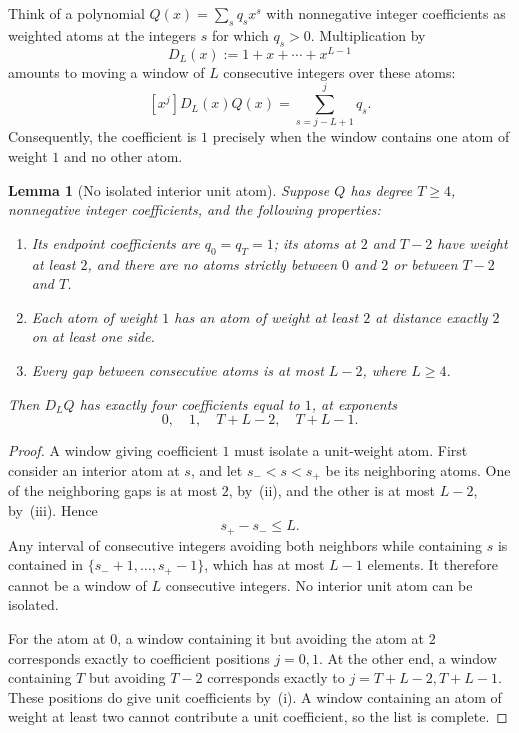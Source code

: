 \documentclass[11pt]{article}
\newtheorem{lemma}[theorem]{Lemma}
\theoremstyle{definition}\newtheorem{definition}[theorem]{Definition}
\theoremstyle{remark}\newtheorem{remark}[theorem]{Remark}
\begin{document}
Think of a polynomial $Q(x)=\sum_s q_sx^s$ with nonnegative integer coefficients as weighted atoms at the integers $s$ for which $q_s>0$. Multiplication by
\[
 D_L(x):=1+x+\cdots+x^{L-1}
\]
amounts to moving a window of $L$ consecutive integers over these atoms:
\begin{equation}\label{eq:window}
 [x^j]D_L(x)Q(x)=\sum_{s=j-L+1}^j q_s.
\end{equation}
Consequently, the coefficient is $1$ precisely when the window contains one atom of weight $1$ and no other atom.

\begin{lemma}[No isolated interior unit atom]\label{lem:window}
Suppose $Q$ has degree $T\geq4$, nonnegative integer coefficients, and the following properties:
\begin{enumerate}[label=(\roman*)]
 \item Its endpoint coefficients are $q_0=q_T=1$; its atoms at $2$ and $T-2$ have weight at least $2$, and there are no atoms strictly between $0$ and $2$ or between $T-2$ and $T$.
 \item Each atom of weight $1$ has an atom of weight at least $2$ at distance exactly $2$ on at least one side.
 \item Every gap between consecutive atoms is at most $L-2$, where $L\geq4$.
\end{enumerate}
Then $D_LQ$ has exactly four coefficients equal to $1$, at exponents
\begin{equation}\label{eq:fourpositions}
 0,\quad1,\quad T+L-2,\quad T+L-1.
\end{equation}
\end{lemma}
\begin{proof}
A window giving coefficient $1$ must isolate a unit-weight atom. First consider an interior atom at $s$, and let $s_-<s<s_+$ be its neighboring atoms. One of the neighboring gaps is at most $2$, by~(ii), and the other is at most $L-2$, by~(iii). Hence
\[
 s_+-s_-\leq L.
\]
Any interval of consecutive integers avoiding both neighbors while containing $s$ is contained in $\{s_-+1,\ldots,s_+-1\}$, which has at most $L-1$ elements. It therefore cannot be a window of $L$ consecutive integers. No interior unit atom can be isolated.

For the atom at $0$, a window containing it but avoiding the atom at $2$ corresponds exactly to coefficient positions $j=0,1$. At the other end, a window containing $T$ but avoiding $T-2$ corresponds exactly to $j=T+L-2,T+L-1$. These positions do give unit coefficients by~(i). A window containing an atom of weight at least two cannot contribute a unit coefficient, so the list is complete.
\end{proof}
\end{document}
